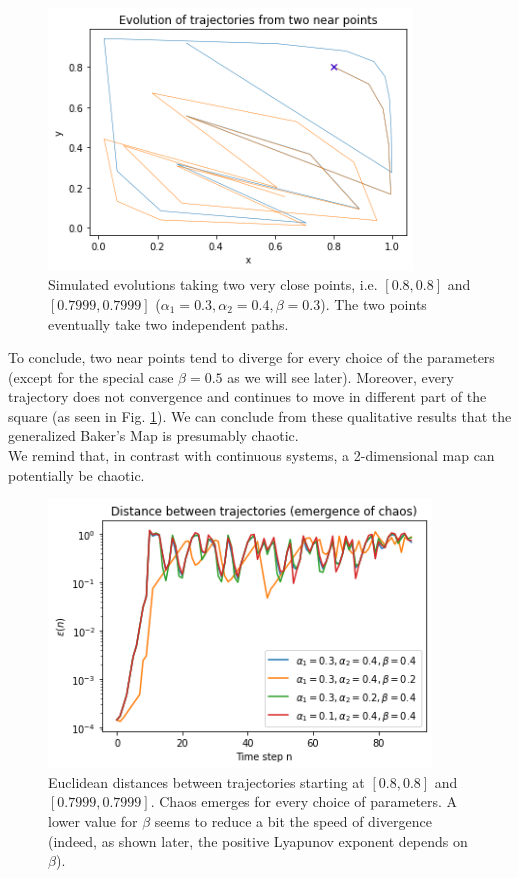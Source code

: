 \documentclass[11pt,titlepage]{article}
\begin{document}
\begin{center}
	\begin{figure} [h]
		\centering
		\includegraphics[width = 3.8in]{./figures/ex3_1_2.png}
		\caption{Simulated evolutions taking two very close points, i.e. $[0.8,0.8]$ and $[0.7999, 0.7999]$ ($\alpha_1=0.3, \alpha_2=0.4, \beta=0.3$). The two points eventually take two independent paths.}
		\label{fig17}
	\end{figure}
\end{center}

To conclude, two near points tend to diverge for every choice of the parameters (except for the special case $\beta=0.5$ as we will see later). Moreover, every trajectory does not convergence and continues to move in different part of the square (as seen in Fig. \ref{fig17}). We can conclude from these qualitative results that the generalized Baker's Map is presumably chaotic. \\
We remind that, in contrast with continuous systems, a 2-dimensional map can potentially be chaotic.

\newpage

\begin{center}
	\begin{figure} [h]
		\centering
		\includegraphics[width = 4in]{./figures/ex3_1_3.png}
		\caption{Euclidean distances between trajectories starting at $[0.8,0.8]$ and $[0.7999, 0.7999]$. Chaos emerges for every choice of parameters. A lower value for $\beta$ seems to reduce a bit the speed of divergence (indeed, as shown later, the positive Lyapunov exponent depends on $\beta$).}
		\label{fig18}
	\end{figure}
\end{center}
\end{document}
